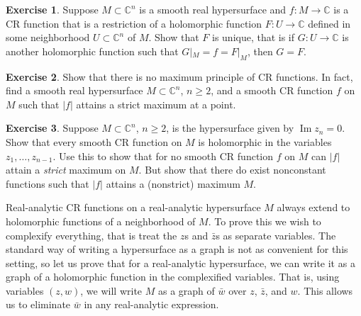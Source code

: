 \documentclass[12pt,openany]{book}
\renewcommand{\Im}{\operatorname{Im}}
\newcommand{\sabs}[1]{\lvert {#1} \rvert}
\newcommand{\C}{{\mathbb{C}}}
\theoremstyle{plain}
\theoremstyle{remark}
\theoremstyle{definition}
\newenvironment{exbox}{%
    \def\FrameCommand{\vrule width 1pt \relax\hspace{10pt}}%
    \MakeFramed{\advance\hsize-\width\FrameRestore}%
}{%
    \endMakeFramed
}
\theoremstyle{exercise}
\newtheorem{exercise}{Exercise}[section]
\theoremstyle{example}
\begin{document}
\begin{exbox}
\begin{exercise}
Suppose $M \subset \C^n$ is a smooth real hypersurface
and $f \colon M \to \C$ is a CR function that is a restriction
of a holomorphic function $F \colon U \to \C$ defined in
some neighborhood $U \subset \C^n$ of $M$.  Show that $F$ is unique,
that is if $G \colon U \to \C$ is another holomorphic function such that
$G|_M = f = F|_M$, then $G=F$.
\end{exercise}

\begin{exercise}
Show that there is no maximum principle of CR functions.  In fact, find a
smooth real hypersurface $M \subset \C^n$, $n \geq 2$, and a smooth CR function
$f$ on $M$ such that $\sabs{f}$ attains a strict maximum at a point.
\end{exercise}

\begin{exercise}
Suppose $M \subset \C^n$, $n \geq 2$, is the hypersurface given by $\Im z_n
= 0$.  Show that every smooth CR function on $M$ is holomorphic in the variables
$z_1,\ldots,z_{n-1}$.  Use this to show that for no smooth CR function $f$ on $M$ can
$\sabs{f}$ attain a \emph{strict} maximum on $M$.  But show that there do
exist nonconstant functions such that $\sabs{f}$ attains a (nonstrict) maximum $M$.
\end{exercise}
\end{exbox}

Real-analytic CR functions on a real-analytic
hypersurface $M$ always extend to holomorphic functions of a neighborhood of $M$.
To prove this we wish to complexify everything, that is treat the
$z$s and $\bar{z}$s as separate variables.  The standard way of
writing a hypersurface as a graph is not as convenient for this setting, so
let us prove that for a real-analytic hypersurface, we can write it as a
graph of a holomorphic function in the complexified variables.  That is,
using variables $(z,w)$,
we will write $M$ as a graph of $\bar{w}$ over $z$, $\bar{z}$, and $w$.
This allows us to eliminate $\bar{w}$ in any real-analytic
expression.
\end{document}
